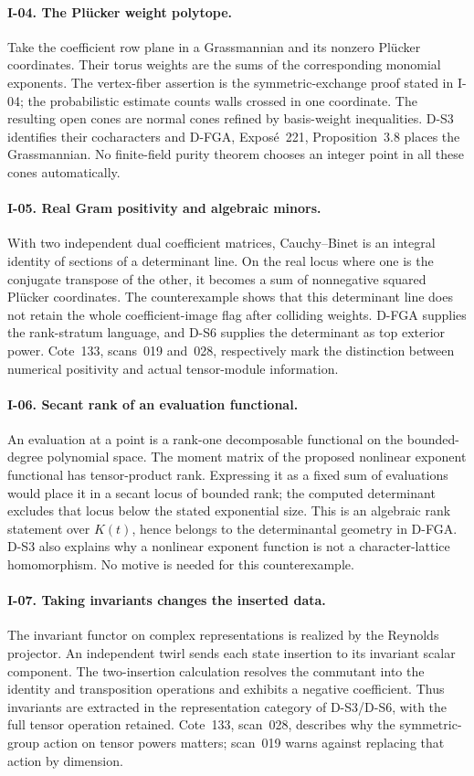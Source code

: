 \documentclass[11pt,a4paper]{article}
\theoremstyle{definition}\newtheorem{definition}{Definition}
\begin{document}
\paragraph{I-04. The Pl\"ucker weight polytope.}
Take the coefficient row plane in a Grassmannian and its nonzero Pl\"ucker coordinates. Their torus weights are the sums of the corresponding monomial exponents. The vertex-fiber assertion is the symmetric-exchange proof stated in I-04; the probabilistic estimate counts walls crossed in one coordinate. The resulting open cones are normal cones refined by basis-weight inequalities. D-S3 identifies their cocharacters and D-FGA, Expos\'e~221, Proposition~3.8 places the Grassmannian. No finite-field purity theorem chooses an integer point in all these cones automatically.

\paragraph{I-05. Real Gram positivity and algebraic minors.}
With two independent dual coefficient matrices, Cauchy--Binet is an integral identity of sections of a determinant line. On the real locus where one is the conjugate transpose of the other, it becomes a sum of nonnegative squared Pl\"ucker coordinates. The counterexample shows that this determinant line does not retain the whole coefficient-image flag after colliding weights. D-FGA supplies the rank-stratum language, and D-S6 supplies the determinant as top exterior power. Cote~133, scans~019 and~028, respectively mark the distinction between numerical positivity and actual tensor-module information.

\paragraph{I-06. Secant rank of an evaluation functional.}
An evaluation at a point is a rank-one decomposable functional on the bounded-degree polynomial space. The moment matrix of the proposed nonlinear exponent functional has tensor-product rank. Expressing it as a fixed sum of evaluations would place it in a secant locus of bounded rank; the computed determinant excludes that locus below the stated exponential size. This is an algebraic rank statement over $K(t)$, hence belongs to the determinantal geometry in D-FGA. D-S3 also explains why a nonlinear exponent function is not a character-lattice homomorphism. No motive is needed for this counterexample.

\paragraph{I-07. Taking invariants changes the inserted data.}
The invariant functor on complex representations is realized by the Reynolds projector. An independent twirl sends each state insertion to its invariant scalar component. The two-insertion calculation resolves the commutant into the identity and transposition operations and exhibits a negative coefficient. Thus invariants are extracted in the representation category of D-S3/D-S6, with the full tensor operation retained. Cote~133, scan~028, describes why the symmetric-group action on tensor powers matters; scan~019 warns against replacing that action by dimension.
\end{document}
